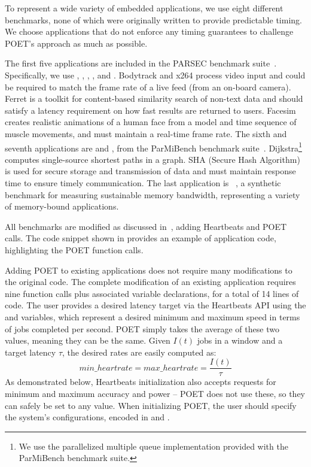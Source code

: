 To represent a wide variety of embedded applications, we use eight different benchmarks, none of which were originally written to provide predictable timing.
We choose applications that do not enforce any timing guarantees to challenge POET's approach as much as possible.

The first five applications are included in the PARSEC benchmark suite~\cite{parsec}.
Specifically, we use , , , , and .
Bodytrack and x264 process video input and could be required to match the frame rate of a live feed (\eg from an on-board camera).
Ferret is a toolkit for content-based similarity search of non-text data and should satisfy a latency requirement on how fast results are returned to users.
Facesim creates realistic animations of a human face from a model and time sequence of muscle movements, and must maintain a real-time frame rate.
The sixth and seventh applications are  and , from the ParMiBench benchmark suite~\cite{parmibench}.
Dijkstra\footnote{We use the parallelized multiple queue implementation provided with the ParMiBench benchmark suite.} computes single-source shortest paths in a graph.
SHA (Secure Hash Algorithm) is used for secure storage and transmission of data and must maintain response time to ensure timely communication.
The last application is ~\cite{stream}, a synthetic benchmark for measuring sustainable memory bandwidth, representing a variety of memory-bound applications.

All benchmarks are modified as discussed in~, adding Heartbeats and POET calls.
The code snippet shown in  provides an example of application code, highlighting the POET function calls.

Adding POET to existing applications does not require many modifications to the original code.
The complete modification of an existing application requires nine function calls plus associated variable declarations, for a total of 14 lines of code.
The user provides a desired latency target via the Heartbeats API using the  and  variables, which represent a desired minimum and maximum speed in terms of jobs completed per second.
POET simply takes the average of these two values, meaning they can be the same.
Given $I(t)$ jobs in a window and a target latency $\tau$, the desired rates are easily computed as:
\begin{equation}
  min\_heartrate = max\_heartrate = \frac{I(t)}{\tau} 
  \label{eqn:latency-to-performance}
\end{equation}
As demonstrated below, Heartbeats initialization also accepts requests for minimum and maximum accuracy and power -- POET does not use these, so they can safely be set to any value.
When initializing POET, the user should specify the system's configurations, encoded in  and .

